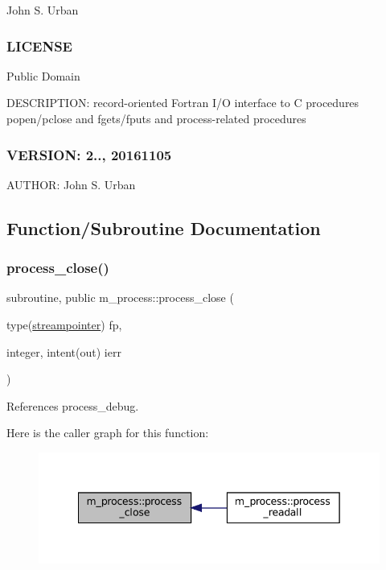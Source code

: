 John S. Urban \subsubsection*{L\+I\+C\+E\+N\+SE}

Public Domain

D\+E\+S\+C\+R\+I\+P\+T\+I\+ON\+: record-\/oriented Fortran I/O interface to C procedures popen/pclose and fgets/fputs and process-\/related procedures \subsubsection*{V\+E\+R\+S\+I\+ON\+: 2.., 20161105}

A\+U\+T\+H\+OR\+: John S. Urban 

\subsection{Function/\+Subroutine Documentation}
\mbox{\label{namespacem__process_ab4c5cad3fb46686f0c9b71c3a634f6ae}} 
\subsubsection{\texorpdfstring{process\+\_\+close()}{process\_close()}}
{\footnotesize\ttfamily subroutine, public m\+\_\+process\+::process\+\_\+close (\begin{DoxyParamCaption}\item[{type(\mbox{\hyperlink{structm__process_1_1streampointer}{streampointer}})}]{fp,  }\item[{integer, intent(out)}]{ierr }\end{DoxyParamCaption})}



References process\+\_\+debug.

Here is the caller graph for this function\+:\nopagebreak
\begin{figure}[H]
\begin{center}
\leavevmode
\includegraphics[width=342pt]{namespacem__process_ab4c5cad3fb46686f0c9b71c3a634f6ae_icgraph}
\end{center}
\end{figure}
\mbox{\label{namespacem__process_a3c0f543a9ceff2671041d73660f60a59}} 
